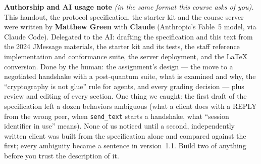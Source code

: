\documentclass[11pt]{article}
\newcommand{\code}[1]{\texttt{#1}}
\begin{document}
\medskip\noindent\textbf{Authorship and AI usage note} \emph{(in the same format this course asks of you).} This handout, the protocol specification, the starter kit and the course server were written by \textbf{Matthew Green} with \textbf{Claude} (Anthropic's Fable~5 model, via Claude Code). Delegated to the AI: drafting the specification and this text from the 2024 JMessage materials, the starter kit and its tests, the staff reference implementation and conformance suite, the server deployment, and the \LaTeX{} conversion. Done by the human: the assignment's design --- the move to a negotiated handshake with a post-quantum suite, what is examined and why, the ``cryptography is not glue'' rule for agents, and every grading decision --- plus review and editing of every section. One thing we caught: the first draft of the specification left a dozen behaviors ambiguous (what a client does with a REPLY from the wrong peer, when \code{send\_text} starts a handshake, what ``session identifier in use'' means). None of us noticed until a second, independently written client was built from the specification alone and compared against the first; every ambiguity became a sentence in version~1.1. Build two of anything before you trust the description of it.
\end{document}

